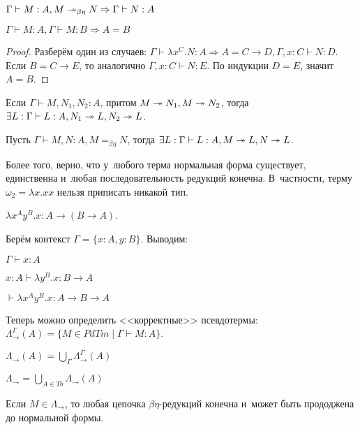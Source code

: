 \documentclass{article}
\begin{document}
\begin{lemma}
	$\Gamma \vdash M: A, M \twoheadrightarrow_{\beta\eta} N \Rightarrow \Gamma \vdash N:A$
\end{lemma}

\begin{claim}
	$\Gamma \vdash M: A, \Gamma \vdash M: B \Rightarrow A = B$
\end{claim}
\begin{proof}
	Разберём один из случаев: $\Gamma \vdash \lambda x^C.N:A \Rightarrow A = C \rightarrow D, \Gamma,
	x: C \vdash N: D$. Если $B = C \rightarrow E$, то аналогично $\Gamma, x: C \vdash N: E$. По
	индукции $D = E$, значит $A = B$.
\end{proof}

\begin{lemma}[о~ромбе]
	Если $\Gamma \vdash M,N_1,N_2: A$, притом $M \twoheadrightarrow N_1, M \twoheadrightarrow N_2$, тогда $\exists
	L: \Gamma \vdash L: A, N_1 \twoheadrightarrow L, N_2 \twoheadrightarrow L$.
\end{lemma}

\begin{theorem}
	Пусть $\Gamma \vdash M, N: A, M =_{\beta\eta} N$, тогда $\exists L: \Gamma \vdash L: A, M
	\twoheadrightarrow L, N \twoheadrightarrow L$.
\end{theorem}

Более того, верно, что у~любого терма нормальная форма существует, единственна и~любая
последовательность редукций конечна. В~частности, терму $\omega_2 = \lambda x.xx$ нельзя приписать
никакой тип.

\begin{example}
	$\lambda x^Ay^B.x: A \rightarrow (B \rightarrow A)$.

	Берём контекст $\Gamma = \{x: A, y: B\}$. Выводим:

	$\Gamma \vdash x: A$

	$x: A \vdash \lambda y^B.x: B \rightarrow A$

	$\vdash \lambda x^A y^B.x:A \rightarrow B \rightarrow A$
\end{example}

Теперь можно определить <<корректные>> псевдотермы:
$\Lambda_\rightarrow^\Gamma(A) = \{ M \in PdTm \mid \Gamma \vdash M: A\}$.

$\Lambda_\rightarrow(A) = \bigcup\limits_{\Gamma} \Lambda^\Gamma_\rightarrow(A)$

$\Lambda_\rightarrow = \bigcup\limits_{A \in Tb} \Lambda_\rightarrow(A)$

\begin{theorem}
	Если $M \in \Lambda_\rightarrow$, то любая цепочка $\beta\eta$-редукций конечна и~может быть
	прододжена до нормальной формы.
\end{theorem}
\end{document}
